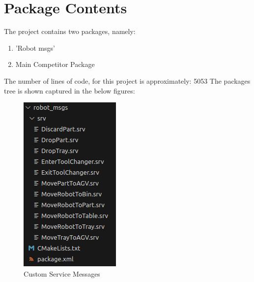 \documentclass{uva-inf-article}
\begin{document}
\newpage

\justifying
\section{Package Contents}

\begin{minipage}{13.5cm}
\noindent \justifying The project contains two packages, namely:
\begin{enumerate}
    \item \justifying 'Robot msgs'
    \item \justifying Main Competitor Package\\
\end{enumerate}
The number of lines of code, for this project is approximately: 5053
The packages tree is shown captured in the below figures: 
\end{minipage}

\begin{figure}[h]
    \centering
    \includegraphics[scale=1]{images/custom_service_msgs.png}
    \caption{Custom Service Messages}
    \label{fig:cusSrvMsgs}
\end{figure}
\end{document}
